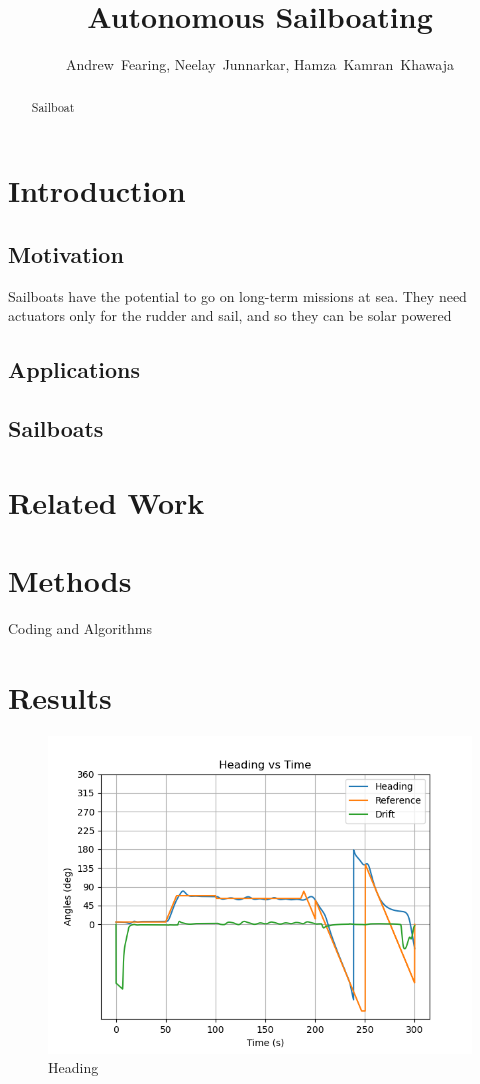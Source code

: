 \documentclass[conference]{IEEEtran}
\begin{document}
\title{Autonomous Sailboating}
\author{Andrew~Fearing, Neelay~Junnarkar,  Hamza~Kamran~Khawaja}
\maketitle


\begin{abstract}
Sailboat

\end{abstract}


\section{Introduction}
\subsection{Motivation}
Sailboats have the potential to go on long-term missions at sea. They need actuators only for the rudder and sail, and so they can be solar powered
\subsection{Applications}
\subsection{Sailboats}

\section{Related Work}


\section{Methods}
Coding and Algorithms
\section{Results}
\begin{figure}
    \centering
    \includegraphics{documents/final_pres_figs/against_wind_to_40_40_heading.png}
    \caption{Heading}
    \label{fig:heading}
\end{figure}
\end{document}
